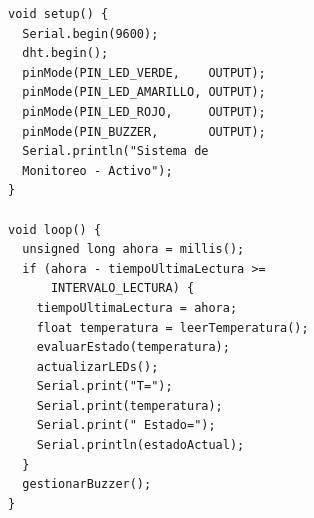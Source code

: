 \begin{lstlisting}[caption={Sistema de Monitoreo de Temperatura con DHT11}, label={lst:monitoreo-temperatura}]
void setup() {
  Serial.begin(9600);
  dht.begin();
  pinMode(PIN_LED_VERDE,    OUTPUT);
  pinMode(PIN_LED_AMARILLO, OUTPUT);
  pinMode(PIN_LED_ROJO,     OUTPUT);
  pinMode(PIN_BUZZER,       OUTPUT);
  Serial.println("Sistema de 
  Monitoreo - Activo");
}

void loop() {
  unsigned long ahora = millis();
  if (ahora - tiempoUltimaLectura >= 
      INTERVALO_LECTURA) {
    tiempoUltimaLectura = ahora;
    float temperatura = leerTemperatura();
    evaluarEstado(temperatura);
    actualizarLEDs();
    Serial.print("T=");
    Serial.print(temperatura);
    Serial.print(" Estado=");
    Serial.println(estadoActual);
  }
  gestionarBuzzer();
}
\end{lstlisting}